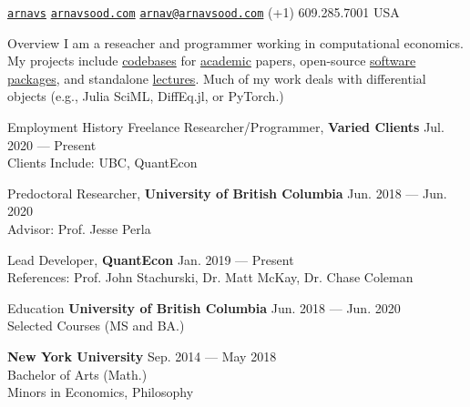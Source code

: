 \documentclass{resume} %
\begin{document}
 \href{https://github.com/arnavs}{\tt arnavs} \vline \hspace{0.5 em} {} \href{https://arnavsood.com}{\tt arnavsood.com} \vline \hspace{0.5 em} {} \href{mailto:arnav@arnavsood.com}{\tt arnav@arnavsood.com} \vline \hspace{0.5 em}  (+1) 609.285.7001 \vline \hspace{0.5 em}  USA 

\begin{rSection}{Overview}
   I am a reseacher and programmer working in computational economics. My projects include \href{https://github.com/jlperla/PerlaTonettiWaugh.jl}{codebases} for \href{https://github.com/jlperla/KnowledgeDiffusionSimulations.jl}{academic} papers, open-source \href{https://github.com/quantecon/expectations.jl}{software} \href{https://github.com/quantecon/instantiatefromurl.jl}{packages}, and standalone \href{https://datascience.quantecon.org/applications/recidivism.html}{lectures}. Much of my work deals with differential objects (e.g., Julia SciML, DiffEq.jl, or PyTorch.)
\end{rSection}

\begin{rSection}{Employment History}
Freelance Researcher/Programmer, {\bf Varied Clients} \hfill {Jul. 2020 --- Present} 
\\ Clients Include: UBC, QuantEcon \smallskip 
    
Predoctoral Researcher, {\bf University of British Columbia} \hfill {Jun. 2018 --- Jun. 2020} 
\\ Advisor: Prof. Jesse Perla \smallskip 

Lead Developer, {\bf QuantEcon} \hfill {Jan. 2019 --- Present}
\\ References: Prof. John Stachurski, Dr. Matt McKay, Dr. Chase Coleman
\end{rSection}

\begin{rSection}{Education}
{\bf University of British Columbia} \hfill {Jun. 2018 --- Jun. 2020} 
\\ Selected Courses (MS and BA.)  %

{\bf New York University} \hfill {Sep. 2014 --- May 2018} 
\\ Bachelor of Arts (Math.) %
\\ Minors in Economics, Philosophy 
\end{rSection}
\end{document}
